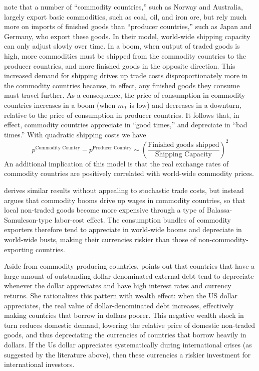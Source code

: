 \documentclass{ar-1col}
\begin{document}
\citet{Readyetal2013} note that a number of ``commodity countries,'' such as Norway and Australia, largely export basic commodities, such as coal, oil, and iron ore, but rely much more on imports of finished goods than ``producer countries,'' such as Japan and Germany, who export these goods. In their model, world-wide shipping capacity can only adjust slowly over time. In a boom, when output of traded goods is high, more commodities must be shipped from the commodity countries to the producer countries, and more finished goods in the opposite direction. This increased demand for shipping drives up trade costs disproportionately more in the commodity countries because, in effect, any finished goods they consume must travel further. As a consequence, the price of consumption in commodity countries increases in a boom (when $m_T$ is low) and decreases in a downturn, relative to the price of consumption in producer countries. It follows that, in effect, commodity countries appreciate in ``good times,'' and depreciate in ``bad times.'' With quadratic shipping costs we have
\begin{equation*}
  p^{\text{Commodity Country}}-p^{\text{Producer Country}}\sim\left(\frac{\text{Finished goods shipped}}{\text{Shipping Capacity}}\right)^2
\end{equation*}
An additional implication of this model is that the real exchange rates of commodity countries are positively correlated with world-wide commodity prices. 

\citet{Powers2015} derives similar results without appealing to stochastic trade costs, but instead argues that commodity booms drive up wages in commodity countries, so that local non-traded goods become more expensive through a type of Balassa-Samuleson-type labor-cost effect. The consumption bundles of commodity exporters therefore tend to appreciate in world-wide booms and depreciate in world-wide busts, making their currencies riskier than those of non-commodity-exporting countries.

Aside from commodity producing countries, \citet{Wiriadinata2020} points out that countries that have a large amount of outstanding dollar-denominated external debt tend to depreciate whenever the dollar appreciates and have high interest rates and currency returns. She rationalizes this pattern with wealth effect: when the US dollar appreciates, the real value of dollar-denominated debt increases, effectively making countries that borrow in dollars poorer. This negative wealth shock in turn reduces domestic demand, lowering the relative price of domestic non-traded goods, and thus depreciating the currencies of countries that borrow heavily in dollars. If the Us dollar appreciates systematically during international crises (as suggested by the literature above), then these currencies a riskier investment for international investors.
\end{document}
